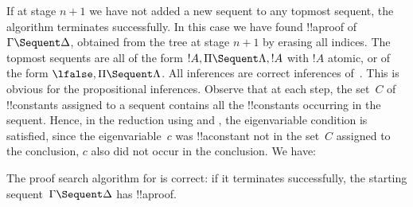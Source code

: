 \documentclass[../../../include/open-logic-section]{subfiles}
\begin{document}
If at stage $n+1$ we have not added a new sequent to any topmost
sequent, the algorithm terminates successfully. In this case we have
found !!a{proof} of~$\Gamma \Sequent \Delta$, obtained from the tree
at stage $n+1$ by erasing all indices. The topmost sequents are all of
the form $!A, \Pi \Sequent \Lambda, !A$ with $!A$ atomic, or of the form $\lfalse, \Pi
\Sequent \Lambda$. All inferences are correct inferences of~.
This is obvious for the propositional inferences. Observe that at each
step, the set~$C$ of !!{constant}s assigned to a sequent contains all
the !!{constant}s occurring in the sequent. Hence, in the reduction
using \LeftR{\lexists} and \RightR{\lforall}, the eigenvariable
condition is satisfied, since the eigenvariable~$c$ was !!a{constant}
not in the set~$C$ assigned to the conclusion, $c$ also did not occur
in the conclusion. We have:

\begin{prop}
The proof search algorithm for  is correct: if it terminates
successfully, the starting sequent~$\Gamma \Sequent \Delta$ has
!!a{proof}.
\end{prop}
\end{document}
